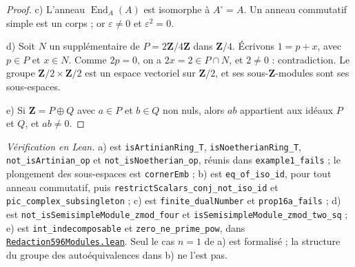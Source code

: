 \begin{proof}
c) L'anneau $\operatorname{End}_A(A)$ est isomorphe à $A^{\circ} = A$. Un anneau commutatif simple est un corps ; or $\varepsilon \neq 0$ et $\varepsilon^2 = 0$.

d) Soit $N$ un supplémentaire de $P = 2\mathbf Z/4\mathbf Z$ dans $\mathbf Z/4$. Écrivons $1 = p + x$, avec $p \in P$ et $x \in N$. Comme $2p = 0$, on a $2x = 2 \in P \cap N$, et $2 \neq 0$ : contradiction. Le groupe $\mathbf Z/2 \times \mathbf Z/2$ est un espace vectoriel sur $\mathbf Z/2$, et ses sous-$\mathbf Z$-modules sont ses sous-espaces.

e) Si $\mathbf Z = P \oplus Q$ avec $a \in P$ et $b \in Q$ non nuls, alors $ab$ appartient aux idéaux $P$ et $Q$, et $ab \neq 0$.
\end{proof}

\begin{sloppypar}
\noindent\emph{Vérification en Lean.} a) est \texttt{isArtinianRing\_T}, \texttt{isNoetherianRing\_T}, \texttt{not\_isArtinian\_op} et \texttt{not\_isNoetherian\_op}, réunis dans \texttt{example1\_fails} ; le plongement des sous-espaces est \texttt{cornerEmb} ; b) est \texttt{eq\_of\_iso\_id}, pour tout anneau commutatif, puis \texttt{restrictScalars\_conj\_not\_iso\_id} et \texttt{pic\_complex\_subsingleton} ; c) est \texttt{finite\_dualNumber} et \texttt{prop16a\_fails} ; d) est \texttt{not\_isSemisimpleModule\_zmod\_four} et \texttt{isSemisimpleModule\_zmod\_two\_sq} ; e) est \texttt{int\_indecomposable} et \texttt{zero\_ne\_prime\_pow}, dans \href{\leanblobmain/Redaction596Modules.lean}{\texttt{Redaction596\allowbreak{}Modules.\allowbreak{}lean}}. Seul le cas $n = 1$ de a) est formalisé ; la structure du groupe des autoéquivalences dans b) ne l'est pas.
\end{sloppypar}

